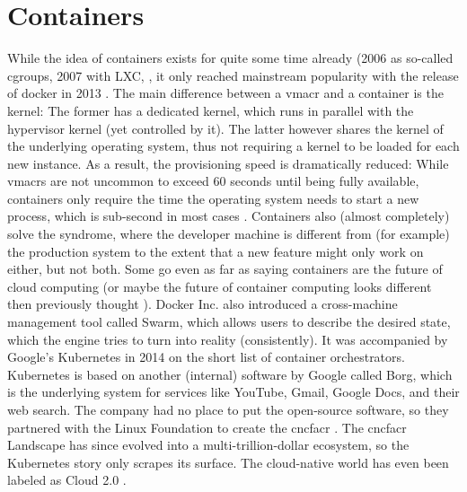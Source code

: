 

\section{Containers}
While the idea of containers exists for quite some time already (2006 as so-called cgroups, 2007 with LXC, \cite{cgroups} \cite{lxc}, it only reached mainstream popularity with the release of docker in 2013 \cite{docker_initial_release}. The main difference between a \gls{vmacr} and a container is the kernel: The former has a dedicated kernel, which runs in parallel with the hypervisor kernel (yet controlled by it). The latter however shares the kernel of the underlying operating system, thus not requiring a kernel to be loaded for each new instance. As a result, the provisioning speed is dramatically reduced: While \gls{vmacr}s are not uncommon to exceed 60 seconds until being fully available, containers only require the time the operating system needs to start a new process, which is sub-second in most cases \cite{vps_provisioning_times}.
\newline
Containers also (almost completely) solve the  syndrome, where the developer machine is different from (for example) the production system to the extent that a new feature might only work on either, but not both.
\newline
Some go even as far as saying containers are the future of cloud computing \cite{containers_future_cloud_computing} \cite{devopsonline_serverless_future} \cite{alibabacloud_serverless_future} \cite{ttpsc_serverless_future} (or maybe the future of container computing looks different then previously thought \cite{azure_modular_datacenter} \cite{google_patent_container}).
\newline
Docker Inc. also introduced a cross-machine management tool called Swarm, which allows users to describe the desired state, which the engine tries to turn into reality (consistently). It was accompanied by Google's Kubernetes in 2014 on the short list of container orchestrators. Kubernetes is based on another (internal) software by Google called Borg, which is the underlying system for services like YouTube, Gmail, Google Docs, and their web search. The company had no place to put the open-source software, so they partnered with the Linux Foundation to create the \gls{cncfacr} \cite{cncf_guide_landscape}. The \gls{cncfacr} Landscape has since evolved into a multi-trillion-dollar ecosystem, so the Kubernetes story only scrapes its surface. The cloud-native world has even been labeled as Cloud 2.0 \cite{alibabacloud_serverless_future}.
